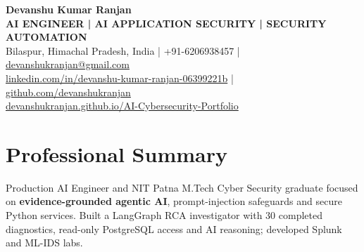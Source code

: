 \documentclass[a4paper,11pt]{article}
\begin{document}
\begin{center}
{\fontsize{17.3}{20}\selectfont\bfseries Devanshu Kumar Ranjan}\\[2pt]
{\small\bfseries AI ENGINEER | AI APPLICATION SECURITY | SECURITY AUTOMATION}\\[4pt]
{\footnotesize Bilaspur, Himachal Pradesh, India \quad | \quad +91-6206938457 \quad | \quad \href{mailto:devanshukranjan@gmail.com}{devanshukranjan@gmail.com}}\\[2pt]
{\footnotesize \href{https://linkedin.com/in/devanshu-kumar-ranjan-06399221b}{linkedin.com/in/devanshu-kumar-ranjan-06399221b} \quad | \quad \href{https://github.com/devanshukranjan}{github.com/devanshukranjan}}\\[2pt]
{\footnotesize \href{https://devanshukranjan.github.io/AI-Cybersecurity-Portfolio/}{devanshukranjan.github.io/AI-Cybersecurity-Portfolio}}
\end{center}
\vspace{-6pt}
\section{Professional Summary}
\small Production AI Engineer and NIT Patna M.Tech Cyber Security graduate focused on \textbf{evidence-grounded agentic AI}, prompt-injection safeguards and secure Python services. Built a LangGraph RCA investigator with 30 completed diagnostics, read-only PostgreSQL access and AI reasoning; developed Splunk and ML-IDS labs.\normalsize
\end{document}
